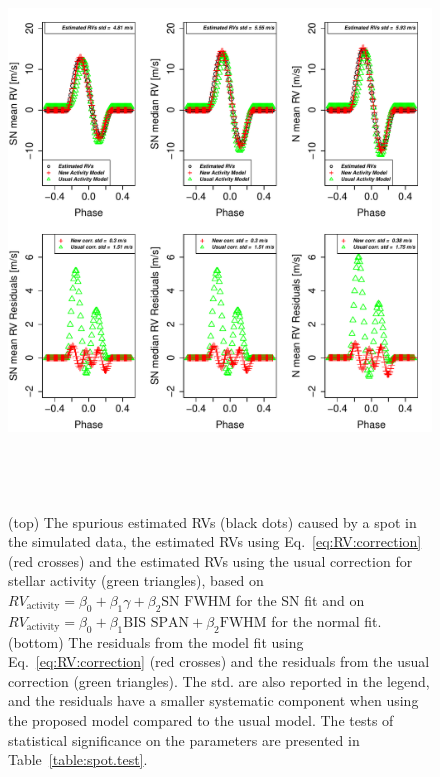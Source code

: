 \documentclass{aa}
\begin{document}
\begin{figure}[htbp]
\begin{center}
\includegraphics[height = 6in]{Spot_NEW_CORRECTION_[3]CorrectionActivity_RadialVelocity_vs_time.pdf} 
   \caption{(top) The spurious estimated RVs (black dots) caused by a spot in the simulated data, the estimated RVs using Eq.~\eqref{eq:RV:correction} (red crosses) and the estimated RVs using the usual correction for stellar activity (green triangles), based on $RV_{\text{activity}}=\beta_0+\beta_1 \gamma + \beta_2 \text{SN FWHM}$ for the SN fit and on $RV_{\text{activity}}=\beta_0+\beta_1 \text{BIS SPAN} + \beta_2 \text{FWHM}$ for the normal fit.
 (bottom) The residuals from the model fit using Eq.~\eqref{eq:RV:correction} (red crosses) and the residuals from the usual correction (green triangles). 
 The std. are also reported in the legend, and the residuals have a smaller systematic component when using the proposed model compared to the usual model.
The tests of statistical significance on the parameters are presented in Table~\ref{table:spot.test}.
}
    \label{fig:spot.correction}
\end{center}
\end{figure}
\end{document}
